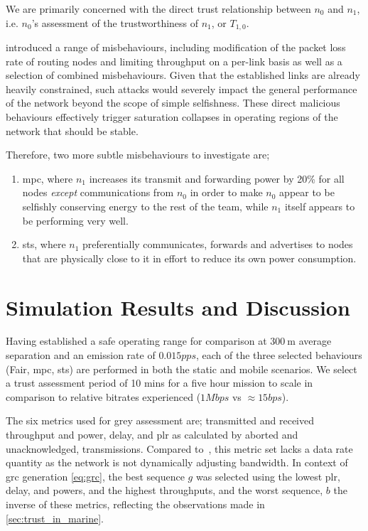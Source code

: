 We are primarily concerned with the direct trust relationship between $n_0$ and $n_1$, i.e. $n_0$'s assessment of the trustworthiness of $n_1$, or $T_{1,0}$.

\citet{Guo11} introduced a range of misbehaviours, including modification of the packet loss rate of routing nodes and limiting throughput on a per-link basis as well as a selection of combined misbehaviours. 
Given that the established links are already heavily constrained, such attacks would severely impact the general performance of the network beyond the scope of simple selfishness.
These direct malicious behaviours effectively trigger saturation collapses in operating regions of the network that should be stable.

Therefore, two more subtle misbehaviours to investigate are; 
\begin{enumerate}
	\item \acrfull{mpc}, where $n_1$ increases its transmit and forwarding power by 20\% for all nodes \emph{except} communications from $n_0$ in order to make $n_0$ appear to be selfishly conserving energy to the rest of the team, while $n_1$ itself appears to be performing very well.
	\item \acrfull{sts}, where $n_1$ preferentially communicates, forwards and advertises to nodes that are physically close to it in effort to reduce its own power consumption.
\end{enumerate}


\section{Simulation Results and Discussion}\label{sec:trustresultsanddiscussion}

Having established a safe operating range for comparison at $\SI{300}{\meter}$ average separation and an emission rate of $0.015pps$, each of the three selected behaviours (Fair, \gls{mpc}, \gls{sts}) are performed in both the static and mobile scenarios. 
We select a trust assessment period of 10 mins for a five hour mission to scale in comparison to relative bitrates experienced ($1Mbps$ vs $\approx15bps$).

The six metrics used for grey assessment are; transmitted and received throughput and power, delay, and \gls{plr} as calculated by aborted and unacknowledged, transmissions.
Compared to~\cite{Guo11}, this metric set lacks a data rate quantity as the network is not dynamically adjusting bandwidth.
In context of \gls{grc} generation \eqref{eq:grc}, the best sequence $g$ was selected using the lowest \gls{plr}, delay, and powers, and the highest throughputs, and the worst sequence, $b$ the inverse of these metrics, reflecting the observations made in \autoref{sec:trust_in_marine}.

